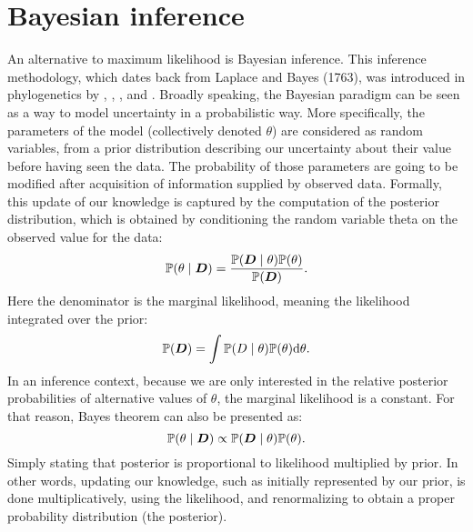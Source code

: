 \section{Bayesian inference}
\label{sec:intro-bayesian}

An alternative to maximum \gls{likelihood} is Bayesian inference.
This inference methodology, which dates back from Laplace and Bayes (1763), was introduced in phylogenetics by \citet{Yang1997}, \citet{Mau1999}, \citet{Larget1999}, \citet{Li2000} and \citet{Huelsenbeck2001}.
Broadly speaking, the Bayesian paradigm can be seen as a way to model uncertainty in a probabilistic way.
More specifically, the parameters of the model (collectively denoted $\theta$) are considered as random variables, from a \gls{prior} distribution describing our uncertainty about their value before having seen the data.
The probability of those parameters are going to be modified after acquisition of information supplied by observed data.
Formally, this update of our knowledge is captured by the computation of the \gls{posterior} distribution, which is obtained by conditioning the random variable theta on the observed value for the data:
\begin{equation}
    \mathbb{P} (\theta \mid \bm{D})=\frac{\mathbb{P} (\bm{D} \mid \theta)\mathbb{P} (\theta)}{\mathbb{P} (\bm{D})}.
\end{equation}
Here the denominator is the marginal \gls{likelihood}, meaning the \gls{likelihood} integrated over the \gls{prior}:
\begin{equation}
    \mathbb{P} (\bm{D}) = \int \mathbb{P} (D \mid \theta) \mathbb{P} (\theta) \mathrm{d} \theta.
\end{equation}
In an inference context, because we are only interested in the relative \gls{posterior} probabilities of alternative values of $\theta$, the marginal \gls{likelihood} is a constant.
For that reason, Bayes theorem can also be presented as:
\begin{equation}
    \mathbb{P} (\theta \mid \bm{D}) \propto \mathbb{P} (\bm{D} \mid \theta)\mathbb{P} (\theta).
\end{equation}
Simply stating that \gls{posterior} is proportional to \gls{likelihood} multiplied by \gls{prior}.
In other words, updating our knowledge, such as initially represented by our \gls{prior}, is done multiplicatively, using the \gls{likelihood}, and renormalizing to obtain a proper probability distribution (the posterior).


